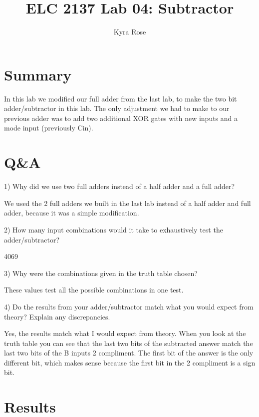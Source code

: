 \documentclass[11pt]{article}
\begin{document}
\title{ELC 2137 Lab 04: Subtractor}
\author{Kyra Rose}

\maketitle


\section*{Summary}

In this lab we modified our full adder from the last lab, to make the two bit adder/subtractor in this lab. The only adjustment we had to make to our previous adder was to add two additional XOR gates with new inputs and a mode input (previously Cin). 


\section*{Q\&A}

1) Why did we use two full adders instead of a half adder and a full adder?

We used the 2 full adders we built in the last lab instead of a half adder and full adder, because it was a simple modification. 

2) How many input combinations would it take to exhaustively test the adder/subtractor?

4069

3) Why were the combinations given in the truth table chosen?

These values test all the possible combinations in one test. 

4) Do the results from your adder/subtractor match what you would expect from theory? Explain any discrepancies. 

Yes, the results match what I would expect from theory. When you look at the truth table you can see that the last two bits of the subtracted answer match the last two bits of the B inputs 2 compliment. The first bit of the answer is the only different bit, which makes sense because the first bit in the 2 compliment is a sign bit. 


\section*{Results}
\end{document}
